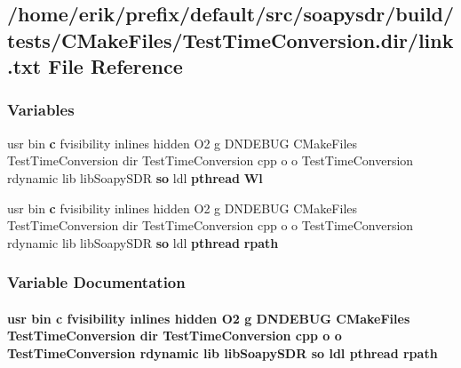 \subsection{/home/erik/prefix/default/src/soapysdr/build/tests/\+C\+Make\+Files/\+Test\+Time\+Conversion.dir/link.txt File Reference}
\label{soapysdr_2build_2tests_2CMakeFiles_2TestTimeConversion_8dir_2link_8txt}
\subsubsection*{Variables}
\begin{DoxyCompactItemize}
\item 
usr bin {\bf c} fvisibility inlines hidden O2 g D\+N\+D\+E\+B\+UG C\+Make\+Files Test\+Time\+Conversion dir Test\+Time\+Conversion cpp o o Test\+Time\+Conversion rdynamic lib lib\+Soapy\+S\+DR {\bf so} ldl {\bf pthread} {\bf Wl}
\item 
usr bin {\bf c} fvisibility inlines hidden O2 g D\+N\+D\+E\+B\+UG C\+Make\+Files Test\+Time\+Conversion dir Test\+Time\+Conversion cpp o o Test\+Time\+Conversion rdynamic lib lib\+Soapy\+S\+DR {\bf so} ldl {\bf pthread} {\bf rpath}
\end{DoxyCompactItemize}


\subsubsection{Variable Documentation}
\paragraph[{rpath}]{\setlength{\rightskip}{0pt plus 5cm}usr bin {\bf c} fvisibility inlines hidden O2 g D\+N\+D\+E\+B\+UG C\+Make\+Files Test\+Time\+Conversion dir Test\+Time\+Conversion cpp o o Test\+Time\+Conversion rdynamic lib lib\+Soapy\+S\+DR {\bf so} ldl {\bf pthread} rpath}\label{soapysdr_2build_2tests_2CMakeFiles_2TestTimeConversion_8dir_2link_8txt_a3cc043bc1871fd61336ac02a90e2fb2b}


